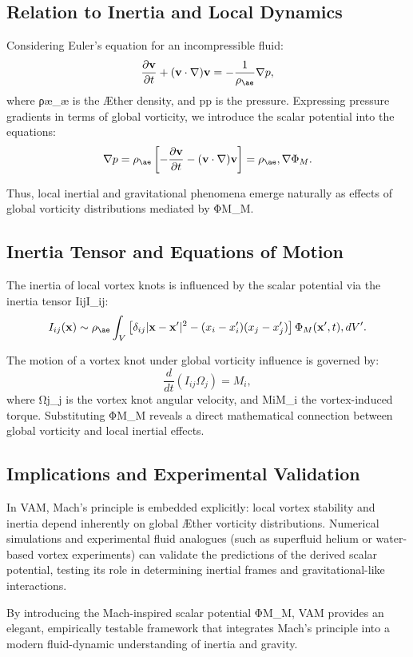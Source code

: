 \subsection{Relation to Inertia and Local Dynamics}
Considering Euler's equation for an incompressible fluid:
\begin{equation}
    \frac{\partial \mathbf{v}}{\partial t}+(\mathbf{v}\cdot \nabla)\mathbf{v}=-\frac{1}{\rho_{\ae}}\nabla p,
\end{equation}
where ρ\ae\rho_{\ae} is the Æther density, and pp is the pressure. Expressing pressure gradients in terms of global vorticity, we introduce the scalar potential into the equations:
\begin{equation}
    \nabla p = \rho_{\ae}\left[-\frac{\partial\mathbf{v}}{\partial t} - (\mathbf{v}\cdot\nabla)\mathbf{v}\right] = \rho_{\ae}, \nabla \Phi_M.
\end{equation}


Thus, local inertial and gravitational phenomena emerge naturally as effects of global vorticity distributions mediated by ΦM\Phi_M.


\subsection{Inertia Tensor and Equations of Motion}
The inertia of local vortex knots is influenced by the scalar potential via the inertia tensor IijI_{ij}:
\begin{equation}
    I_{ij}(\mathbf{x}) \sim \rho_{\ae}\int_V \left[\delta_{ij}|\mathbf{x}-\mathbf{x}'|^2 - (x_i - x'_i)(x_j - x'_j)\right]\Phi_M(\mathbf{x}',t), dV'.
\end{equation}


The motion of a vortex knot under global vorticity influence is governed by:
\begin{equation}
    \frac{d}{dt}(I_{ij}\Omega_j) = M_i,
\end{equation}
where Ωj\Omega_j is the vortex knot angular velocity, and MiM_i the vortex-induced torque. Substituting ΦM\Phi_M reveals a direct mathematical connection between global vorticity and local inertial effects.


\subsection{Implications and Experimental Validation}
In VAM, Mach's principle is embedded explicitly: local vortex stability and inertia depend inherently on global Æther vorticity distributions. Numerical simulations and experimental fluid analogues (such as superfluid helium or water-based vortex experiments) can validate the predictions of the derived scalar potential, testing its role in determining inertial frames and gravitational-like interactions.


By introducing the Mach-inspired scalar potential ΦM\Phi_M, VAM provides an elegant, empirically testable framework that integrates Mach's principle into a modern fluid-dynamic understanding of inertia and gravity.
